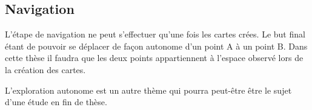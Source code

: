 \subsection{Navigation}

L'étape de navigation ne peut s'effectuer qu'une fois les cartes crées.
Le but final étant de pouvoir se déplacer de façon autonome d'un point A à un point B.
Dans cette thèse il faudra que les deux points appartiennent à l'espace observé lors de la création des cartes.

L'exploration autonome est un autre thème qui pourra peut-être être le sujet d'une étude en fin de thèse.



